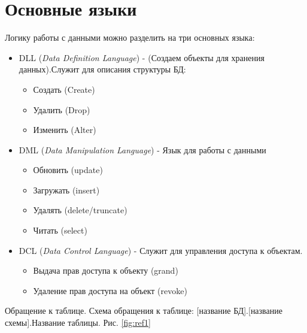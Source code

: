\begin{figure}[ht!]
\end{figure}

\section{Основные языки}
Логику работы с данными можно разделить на три основных языка:
\begin{itemize}
	\item DLL (\textit{Data Definition Language}) - (Создаем объекты для хранения данных).Служит для описания структуры БД:
	      \begin{itemize}
		      \item Создать (Create)
		      \item Удалить (Drop)
		      \item Изменить (Alter)
	      \end{itemize}


	\item DML  (\textit{Data Manipulation Language}) -  Язык для работы с данными
	      \begin{itemize}
		      \item Обновить (update)
		      \item Загружать (insert)
		      \item Удалять (delete/truncate)
		      \item Читать (select)
	      \end{itemize}

	\item DCL (\textit{Data Control Language}) - Служит для управления доступа к объектам.
	      \begin{itemize}
		      \item Выдача прав доступа к объекту (grand)
		      \item Удаление прав доступа на объект (revoke)
	      \end{itemize}
\end{itemize}

Обращение к таблице.
Схема обращения к таблице:
[название БД].[название схемы].Название таблицы. Рис. \ref{fig:ref1}


\begin{figure}[ht!]
\end{figure}

